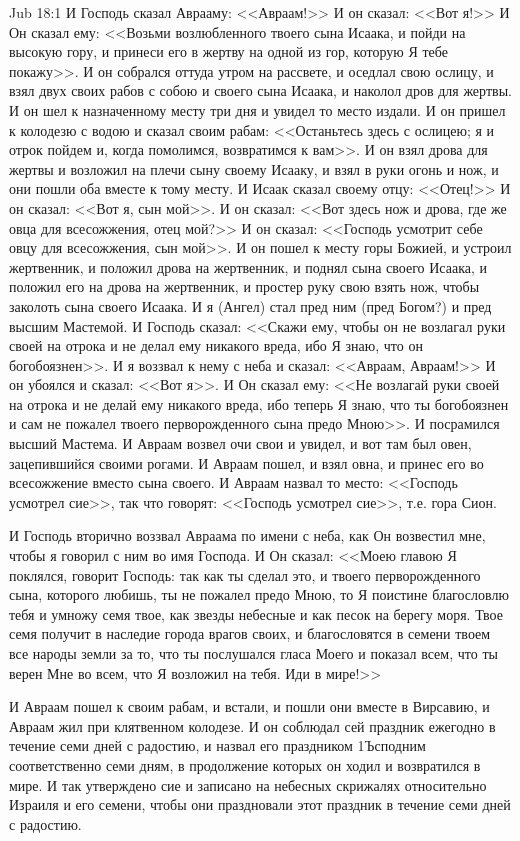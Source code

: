 \vs Jub 18:1
И Господь сказал Аврааму: <<Авраам!>> И он
сказал: <<Вот я!>> И Он сказал ему: <<Возьми
возлюбленного твоего сына Исаака, и пойди на
высокую гору, и принеси его в жертву на одной
из гор, которую Я тебе покажу>>. И он собрался
оттуда утром на рассвете, и оседлал свою ослицу, и
взял двух своих рабов с собою и своего сына
Исаака, и наколол дров для жертвы. И он шел к назначенному
месту три дня и увидел то место издали. И он
пришел к колодезю с водою и сказал своим рабам:
<<Останьтесь здесь с ослицею; я и отрок пойдем и,
когда помолимся, возвратимся к вам>>. И он взял
дрова для жертвы и возложил на плечи сыну своему
Исааку, и взял в руки огонь и нож, и они пошли оба
вместе к тому месту. И Исаак сказал своему отцу:
<<Отец!>> И он сказал: <<Вот я, сын мой>>.
И он сказал: <<Вот здесь нож и дрова, где же овца
для всесожжения, отец мой?>> И он сказал:
<<Господь усмотрит себе овцу для всесожжения,
сын мой>>. И он пошел к месту горы Божией, и
устроил жертвенник, и положил дрова на
жертвенник, и поднял сына своего Исаака, и
положил его на дрова на жертвенник, и простер
руку свою взять нож, чтобы заколоть сына своего
Исаака. И я (Ангел) стал пред ним (пред Богом?) и
пред высшим Мастемой. И Господь сказал: <<Скажи
ему, чтобы он не возлагал руки своей на отрока и
не делал ему никакого вреда, ибо Я знаю, что он
богобоязнен>>. И я воззвал к нему с неба и
сказал: <<Авраам, Авраам!>> И он убоялся и
сказал: <<Вот я>>. И Он сказал ему: <<Не
возлагай руки своей на отрока и не делай ему
никакого вреда, ибо теперь Я знаю, что ты
богобоязнен и сам не пожалел твоего
перворожденного сына предо Мною>>. И посрамился
высший Мастема. И Авраам возвел очи свои и увидел,
и вот там был овен, зацепившийся своими рогами. И
Авраам пошел, и взял овна, и принес его во
всесожжение вместо сына своего. И Авраам назвал
то место: <<Господь усмотрел сие>>, так что
говорят: <<Господь усмотрел сие>>, т.е.
гора Сион.

И Господь вторично воззвал Авраама по имени с
неба, как Он возвестил мне, чтобы я говорил с ним
во имя Господа. И Он сказал: <<Моею главою Я
поклялся, говорит Господь: так как ты сделал это,
и твоего перворожденного сына, которого любишь,
ты не пожалел предо Мною, то Я поистине
благословлю тебя и умножу семя твое, как звезды
небесные и как песок на берегу моря. Твое семя
получит в наследие города врагов своих, и
благословятся в семени твоем все народы земли за
то, что ты послушался гласа Моего и показал всем,
что ты верен Мне во всем, что Я возложил на тебя.
Иди в мире!>>

И Авраам пошел к своим рабам, и встали, и пошли
они вместе в Вирсавию, и Авраам жил при
клятвенном колодезе. И он соблюдал сей праздник
ежегодно в течение семи дней с радостию, и назвал
его праздником 1Ъсподним соответственно семи
дням, в продолжение которых он ходил и
возвратился в мире. И так утверждено сие и
записано на небесных скрижалях относительно
Израиля и его семени, чтобы они праздновали этот
праздник в течение семи дней с радостию.

